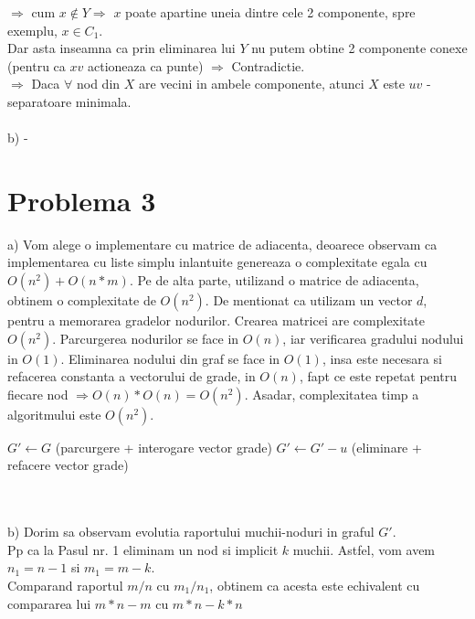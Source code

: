 \documentclass{article}
\begin{document}
 $\Rightarrow$ cum $x\notin Y\Rightarrow$ $x$ poate apartine uneia dintre cele 2 componente, spre exemplu, $x\in C_{1}$.\\
 Dar asta inseamna ca prin eliminarea lui $Y$ nu putem obtine 2 componente conexe (pentru ca $xv$ actioneaza ca punte) $\Rightarrow$ Contradictie.\\
 $\Rightarrow$ Daca $\forall$ nod din $X$ are vecini in ambele componente, atunci $X$ este $uv$ - separatoare minimala.\\
 \bigskip\\
b) -



\newpage
\section*{Problema 3}
\Large
a) Vom alege o implementare cu matrice de adiacenta, deoarece observam ca implementarea cu liste simplu inlantuite genereaza o complexitate egala cu $O(n^2) + O(n*m)$. Pe de alta parte, utilizand o matrice de adiacenta, obtinem o complexitate de $O(n^2)$. De mentionat ca utilizam un vector $d$, pentru a memorarea gradelor nodurilor. Crearea matricei are complexitate $O(n^2)$. Parcurgerea nodurilor se face in $O(n)$, iar verificarea gradului nodului in $O(1)$. Eliminarea nodului din graf se face in $O(1)$, insa este necesara si refacerea constanta a vectorului de grade, in $O(n)$, fapt ce este repetat pentru fiecare nod $\Rightarrow O(n)*O(n)=O(n^2)$. Asadar, complexitatea timp a algoritmului este $O(n^2)$.
\makeatletter
\def\BState{\State\hskip-\ALG@thistlm}
\makeatother
\begin{algorithm}
\begin{algorithmic}[1]
\State $G' \gets \textit{$G$}$ 
(parcurgere + interogare vector grade)
\State $G' \gets \textit{$G' - u$}$ (eliminare + refacere vector grade)
\EndWhile \\
\end{algorithmic}
\end{algorithm}\\
\bigskip\\
b) Dorim sa observam evolutia raportului muchii-noduri in graful $G'$.\\
Pp ca la Pasul nr. 1 eliminam un nod si implicit  $k$ muchii. Astfel, vom avem $n_{1}=n-1$ si $m_{1}=m-k$.\\
Comparand raportul $m/n$ cu $m_{1}/ n_{1}$, obtinem ca acesta este echivalent cu compararea lui $m*n - m $ cu $m * n - k * n$\\
\end{document}
